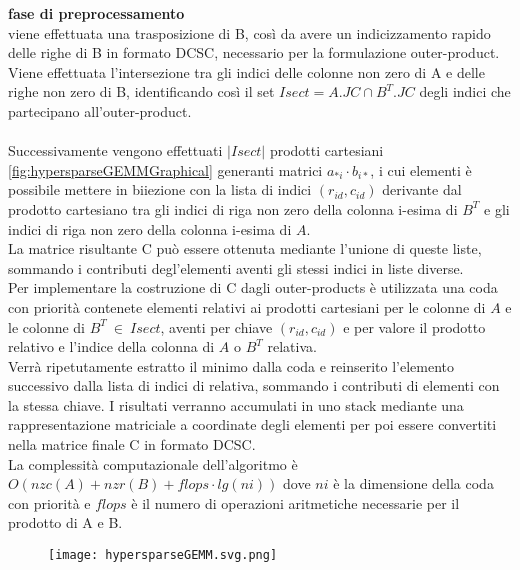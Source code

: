 {\bf fase di preprocessamento} \\
viene effettuata una trasposizione di B, così da avere un indicizzamento rapido delle righe di B
in formato DCSC, necessario per la
formulazione outer-product.\\ %
Viene effettuata l'intersezione tra gli indici delle colonne non zero di A e
delle righe non zero di B, identificando così il set $Isect = A.JC \cap B^T.JC$ degli
indici che partecipano all'outer-product.\\
\\
Successivamente vengono effettuati $|Isect|$ prodotti cartesiani \ref{fig:hypersparseGEMMGraphical} 
generanti matrici $a_{*i} \cdot b_{i*}$, i cui elementi è possibile mettere in biiezione 
con la lista di indici $(r_{id},c_{id})$ derivante dal prodotto cartesiano tra gli indici
di riga non zero della colonna i-esima di $B^T$ e gli indici di riga non zero 
della colonna i-esima di $A$.\\
La matrice risultante C può essere ottenuta mediante l'unione di queste liste,
sommando i contributi degl'elementi aventi gli stessi indici in liste
diverse.\\
Per implementare la costruzione di C dagli outer-products
è utilizzata una coda con priorità contenete elementi relativi ai
prodotti cartesiani per le colonne di $A$ e le colonne di $B^T ~\in~ Isect$, 
aventi per chiave $(r_{id},c_{id})$ e per valore il prodotto relativo e l'indice
della colonna di $A$ o $B^T$ relativa.\\
Verrà ripetutamente estratto il minimo dalla coda e reinserito
l'elemento successivo dalla lista di indici di relativa, sommando i
contributi di elementi con la stessa chiave.
I risultati verranno accumulati in uno stack mediante una rappresentazione
matriciale a coordinate degli elementi %
per poi essere convertiti nella matrice finale C in formato DCSC.\\

La complessità computazionale dell'algoritmo è $O(nzc(A) + nzr(B) +flops \cdot lg( ni))$
dove $ni$ è la dimensione della coda con priorità e $flops$ è il numero di
operazioni aritmetiche necessarie per il prodotto di A e B.\\

\begin{figure}[h]
  \centering \texttt{[image: hypersparseGEMM.svg.png]}
  \caption[Algoritmo sequenziale per SpGEMM tra matrici ipersparse] \decoRule \label{figCode:hypersparseGEMM}
\end{figure}

